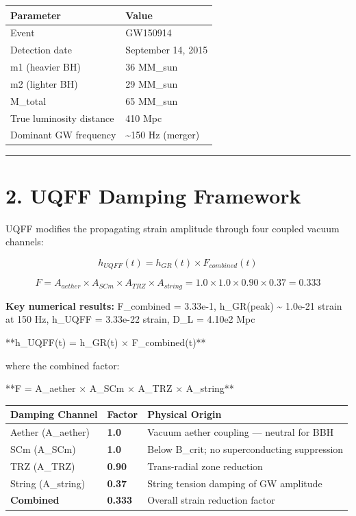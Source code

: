 \documentclass[11pt]{article}
\begin{document}
\begin{center}
\begin{longtable}{ll}
\toprule
Parameter & Value \tabularnewline
\midrule
\endhead
Event & GW150914 \tabularnewline
Detection date & September 14, 2015 \tabularnewline
m1 (heavier BH) & 36 MM\_sun \tabularnewline
m2 (lighter BH) & 29 MM\_sun \tabularnewline
M\_total & 65 MM\_sun \tabularnewline
True luminosity distance & 410 Mpc \tabularnewline
Dominant GW frequency & \textasciitilde{}150 Hz (merger) \tabularnewline
\bottomrule
\end{longtable}
\end{center}

\noindent\rule{\textwidth}{0.4pt}

\section*{2. UQFF Damping Framework}

UQFF modifies the propagating strain amplitude through four coupled vacuum channels:

$$h_{UQFF}(t) = h_{GR}(t) \times F_{combined}(t)$$

$$F = A_{aether} \times A_{SCm} \times A_{TRZ} \times A_{string} = 1.0 \times 1.0 \times 0.90 \times 0.37 = 0.333$$

\textbf{Key numerical results:} F\_combined = 3.33e-1, h\_GR(peak) \textasciitilde{} 1.0e-21 strain at 150 Hz, h\_UQFF = 3.33e-22 strain, D\_L = 4.10e2 Mpc

**h\_UQFF(t) = h\_GR(t) $\times$ F\_combined(t)**

where the combined factor:

**F = A\_aether $\times$ A\_SCm $\times$ A\_TRZ $\times$ A\_string**

\begin{center}
\begin{longtable}{lll}
\toprule
Damping Channel & Factor & Physical Origin \tabularnewline
\midrule
\endhead
Aether (A\_aether) & \textbf{1.0} & Vacuum aether coupling --- neutral for BBH \tabularnewline
SCm (A\_SCm) & \textbf{1.0} & Below B\_crit; no superconducting suppression \tabularnewline
TRZ (A\_TRZ) & \textbf{0.90} & Trans-radial zone reduction \tabularnewline
String (A\_string) & \textbf{0.37} & String tension damping of GW amplitude \tabularnewline
\textbf{Combined} & \textbf{0.333} & Overall strain reduction factor \tabularnewline
\bottomrule
\end{longtable}
\end{center}
\end{document}
